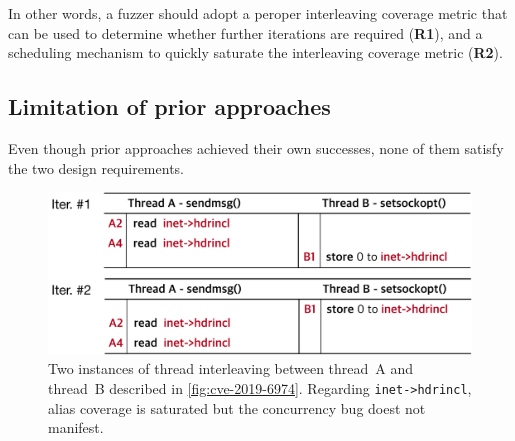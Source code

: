 In other words, a fuzzer should adopt a peroper interleaving coverage
metric that can be used to determine whether further iterations are
required (\textbf{R1}), and a scheduling mechanism to quickly saturate
the interleaving coverage metric (\textbf{R2}).



\subsection{Limitation of prior approaches}
\label{ss:existingapproaches}

Even though prior approaches achieved their own successes, none of
them satisfy the two design requirements.


\begin{figure}[t]
  \centering
  \includegraphics[width=0.95\linewidth]{fig/alias-coverage.pdf}
  \caption{Two instances of thread interleaving between thread~A and
    thread~B described in \autoref{fig:cve-2019-6974}. Regarding
    \texttt{inet->hdrincl}, alias coverage is saturated but the
    concurrency bug doest not manifest.}
  \label{fig:alias-coverage}
\end{figure}








